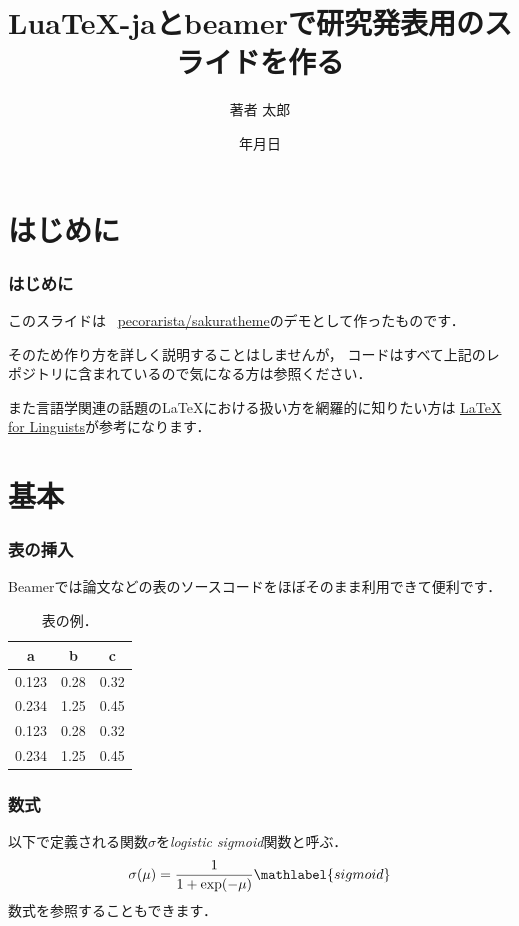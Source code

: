 \documentclass[%
    hyperref={%
        colorlinks,
        linkcolor=sDarkBlue,
        urlcolor=sDarkBlue,
        citecolor=sDarkBlue
    },
    aspectratio=169
]{beamer}
\title{Lua\TeX{}-jaとbeamerで研究発表用のスライドを作る}
\institute{所属}
\author{著者 太郎}
\date{{\number\year}年{\number\month}月{\number\day}日}
\DeclareMathOperator{\exponential}{exp}
\newcommand\header[1]{\multicolumn{1}{c}{\textbf{#1}}}
\begin{document}
    \maketitle

    \section{はじめに}
    \begin{frame}
        \frametitle{はじめに}
        このスライドは \faGithub\ \href{https://github.com/pecorarista/sakuratheme}{\ttfamily pecorarista/sakuratheme}のデモとして作ったものです．

        \bigskip

        そのため作り方を詳しく説明することはしませんが，
        コードはすべて上記のレポジトリに含まれているので気になる方は参照ください．
        \bigskip

        また言語学関連の話題の\LaTeX における扱い方を網羅的に知りたい方は
        \href{https://www1.essex.ac.uk/linguistics/external/clmt/latex4ling/}
        {LaTeX for Linguists}が参考になります．
    \end{frame}

    \section{基本}
    \begin{frame}
        \frametitle{表の挿入}
        Beamerでは論文などの表のソースコードをほぼそのまま利用できて便利です．
        \begin{table}
            \centering
            \caption{表の例．}
            \begin{tabular}{rrr}
                \toprule
                \header{a} & \header{b} & \header{c} \\
                \midrule
                0.123 & 0.28  & 0.32 \\
                0.234 & 1.25  & 0.45 \\
                0.123 & 0.28  & 0.32 \\
                0.234 & 1.25  & 0.45 \\
                \bottomrule
            \end{tabular}
        \end{table}
    \end{frame}

    \begin{frame}
        \frametitle{数式}
        以下で定義される関数$\sigma$を\emph{logistic sigmoid}関数と呼ぶ\citep{prml}．
        \begin{align}
            \sigma(\mu) = \frac{1}{1 + \exponential(-\mu)} \mathlabel{sigmoid}
        \end{align}
        数式を参照することもできます．
    \end{frame}
\end{document}
